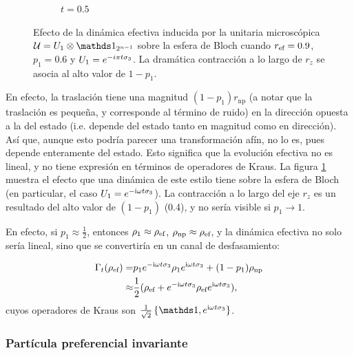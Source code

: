 \begin{figure}[ht!]
\begin{subfigure}{0.32\textwidth}
      \caption{$t=0.5$}
    \end{subfigure}
    \caption{Efecto de la dinámica efectiva inducida por la unitaria microscópica $\mcU=U_{1}\otimes\Id_{2^{n-1}}$ sobre la esfera de Bloch cuando $r_{\text{ef}}=0.9$, $p_{1}=0.6$ y $U_{1}=e^{-i\pi t \sigma_{3}}$. La dramática contracción a lo largo de $r_{z}$ se asocia al alto valor de $1-p_{1}$. \label{fig:FaseChangeSequence}}
\end{figure}

En efecto, la traslación tiene una magnitud $(1-p_{1})r_{\text{np}}$ (a notar que la traslación es pequeña, y corresponde al término de ruido) en la dirección opuesta a la del estado (i.e. depende del estado tanto en magnitud como en dirección). Así que, aunque esto podría parecer una transformación afín, no lo es, pues depende enteramente del estado. Esto significa que la evolución efectiva no es lineal, y no tiene expresión en términos de operadores de Kraus. La figura \ref{fig:FaseChangeSequence} muestra el efecto que una dinámica de este estilo tiene sobre la esfera de Bloch (en particular, el caso $U_{1}=e^{-\text{i}\omega t \sigma_{3}}$). La contracción a lo largo del eje $r_{z}$ es un resultado del alto valor de $(1-p_{1})$ (0.4), y no sería visible si $p_{1}\rightarrow 1$.


En efecto, si $p_{1}\approx\frac{1}{2}$, entonces $\rho_{1}\approx\rho_{\text{ef}}$, $\rho_{\text{np}}\approx\rho_{\text{ef}}$, y la dinámica efectiva no solo sería lineal, sino que se convertiría en un canal de desfasamiento:

\begin{align}
    \Gamma_{t}(\rho_{\text{ef}})=&p_{1}e^{-\text{i}\omega t \sigma_{3}}\rho_{1}e^{\text{i}\omega t \sigma_{3}}+(1-p_{1})\rho_{\text{np}}\nonumber\\
    \approx&\frac{1}{2}(\rho_{\text{ef}}+e^{-\text{i}\omega t \sigma_{3}}\rho_{\text{ef}} e^{\text{i}\omega t \sigma_{3}}),\nonumber
\end{align}
cuyos operadores de Kraus son $\frac{1}{\sqrt{2}}\left\{\Id, e^{\rmi\omega t \pauli{3}} \right\}$.
\subsubsection{Partícula preferencial invariante}


